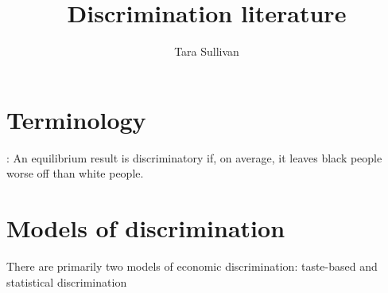 \documentclass[10 pt]{article}
\begin{document}



\title{Discrimination literature}
\author{Tara Sullivan}

\maketitle
\onehalfspacing

\noindent{}

\section{Terminology}

\begin{blist}

\item \textcite{LL12}: An equilibrium result is discriminatory if, on average, it leaves black people worse off than white people. 

\end{blist}



\section{Models of discrimination}

There are primarily two models of economic discrimination: taste-based and statistical discrimination
\end{document}

